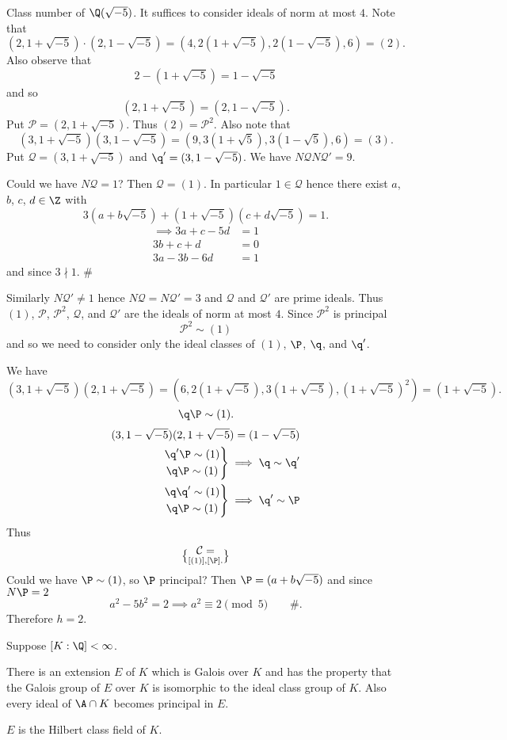 Class number of $\Q(\sqrt{-5})$.  It suffices to consider ideals of norm at most $4$.  Note that
\[ (2,1+\sqrt{-5})\cdot(2,1-\sqrt{-5})=(4,2(1+\sqrt{-5}),2(1-\sqrt{-5}),6) = (2) . \]
Also observe that
\[ 2 - (1+\sqrt{-5}) = 1 - \sqrt{-5} \]
and so
\[ (2,1+\sqrt{-5}) = (2,1-\sqrt{-5}) . \]
Put $\mathcal{P}=(2,1+\sqrt{-5})$.  Thus $(2)=\mathcal{P}^2$.  Also note that
\[ (3,1+\sqrt{-5})(3,1-\sqrt{-5}) = (9,3(1+\sqrt{5}),3(1-\sqrt{5}),6) = (3) . \]
Put $\mathcal{Q}=(3,1+\sqrt{-5})$ and $\q'=(3,1-\sqrt{-5})$.  We have $N\mathcal{Q}N\mathcal{Q}'=9$.

Could we have $N\mathcal{Q}=1$?  Then $\mathcal{Q}=(1)$.  In particular $1\in\mathcal{Q}$ hence there exist $a$, $b$, $c$, $d\in\Z$ with
\[ 3(a+b\sqrt{-5})+(1+\sqrt{-5})(c+d\sqrt{-5}) = 1 . \]
\begin{align*}
\implies 3a + c - 5d &= 1 \\
3b + c + d &= 0 \\ \hline
3a - 3b - 6d &= 1
\end{align*}
and since $3\nmid1$. \#

Similarly $N\mathcal{Q}'\neq1$ hence $N\mathcal{Q}=N\mathcal{Q}'=3$ and $\mathcal{Q}$ and $\mathcal{Q}'$ are prime ideals.  Thus $(1)$, $\mathcal{P}$, $\mathcal{P}^2$, $\mathcal{Q}$, and $\mathcal{Q}'$ are the ideals of norm at most $4$.  Since $\mathcal{P}^2$ is principal
\[ \mathcal{P}^2 \sim (1) \]
and so we need to consider only the ideal classes of $(1)$, $\P$, $\q$, and $\q'$.

We have
\[ (3,1+\sqrt{-5})(2,1+\sqrt{-5}) = (6,2(1+\sqrt{-5}),3(1+\sqrt{-5}),(1+\sqrt{-5})^2) = (1+\sqrt{-5}) . \]
\[ \q\P \sim (1) . \]
\begin{align*}
(3,1-\sqrt{-5})(2,1+\sqrt{-5}) = (1-\sqrt{-5}) \\
\left.\begin{gathered}
\q'\P \sim (1) \\
\q\P \sim (1)
\end{gathered}\right\} \implies \q \sim \q' \\
\left.\begin{gathered}
\q\q' \sim (1) \\
\q\P \sim (1)
\end{gathered}\right\} \implies \q' \sim \P
\end{align*}
Thus \[\mathcal{C}=\brace{[(1)],[\P]} . \]
Could we have $\P\sim(1)$, so $\P$ principal?  Then $\P=(a+b\sqrt{-5})$ and since $N\P=2$
\[ a^2 - 5 b^2 = 2 \implies a^2 \equiv 2 \pmod 5 \qquad \# . \]
Therefore $h=2$.

Suppose $[K:\Q]<\infty$.

There is an extension $E$ of $K$ which is Galois over $K$ and has the property that the Galois group of $E$ over $K$ is isomorphic to the ideal class group of $K$.  Also every ideal of $\A\cap K$ becomes principal in $E$.

$E$ is the Hilbert class field of $K$.
